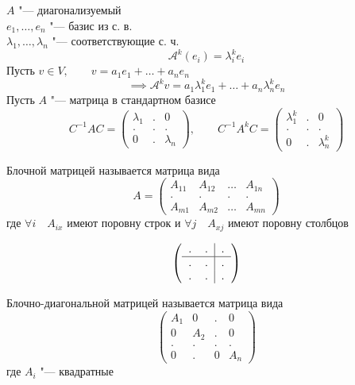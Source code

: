 \begin{remark}
	$ A $ "--- диагонализуемый \\
	$ e_1, \dots, e_n $ "--- базис из с. в. \\
	$ \lambda_1, \dots, \lambda_n $ "--- соответствующие с. ч.
	$$ \mathcal{A}^k(e_i) = \lambda_i^ke_i $$
	Пусть $ v \in V, \qquad v = a_1e_1 + \dots + a_ne_n $
	$$ \implies \mathcal{A}^kv = a_1\lambda_1^ke_1 + \dots + a_n\lambda_n^ke_n $$
	Пусть $ A $ "--- матрица в стандартном базисе
	$$ C^{-1}AC =
	\begin{pmatrix}
		\lambda_1 & . & 0 \\
		. & . & . \\
		0 & . & \lambda_n
	\end{pmatrix}, \qquad C^{-1}A^kC =
	\begin{pmatrix}
		\lambda_1^k & . & 0 \\
		. & . & . \\
		0 & . & \lambda_n^k
	\end{pmatrix} $$
\end{remark}

\begin{definition}
	Блочной матрицей называется матрица вида
	$$ A =
	\begin{pmatrix}
		A_{11} & A_{12} & \dots & A_{1n} \\
		. & . & . & . \\
		A_{m1} & A_{m2} & \dots & A_{mn}
	\end{pmatrix} $$
	где $ \forall i \quad A_{ix} $ имеют поровну строк и $ \forall j \quad A_{xj} $ имеют поровну столбцов
\end{definition}

\begin{eg}
	$$ \left(
	\begin{tabular}{c c | c}
		. & . & . \\
		\hline
		. & . & . \\
		. & . & .
	\end{tabular} \right) $$
\end{eg}

\begin{definition}
	Блочно-диагональной матрицей называется матрица вида
	$$
	\begin{pmatrix}
		A_1 & 0 & . & 0 \\
		0 & A_2 & . & 0 \\
		. & . & . & . \\
		0 & . & 0 & A_n
	\end{pmatrix} $$
	где $ A_i $ "--- квадратные
\end{definition}

